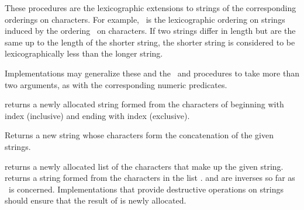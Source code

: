 \begin{entry}{%
}

These procedures are the lexicographic extensions to strings of the
corresponding orderings on characters.  For example, \ is
the lexicographic ordering on strings induced by the ordering
\ on characters.  If two strings differ in length but
are the same up to the length of the shorter string, the shorter string
is considered to be lexicographically less than the longer string.

Implementations may generalize these and the \ and
 procedures to take more than two arguments, as with
the corresponding numeric predicates.

\end{entry}


\begin{entry}{%
}

 returns a newly allocated string formed from the characters of
 beginning with index  (inclusive) and ending with index
 (exclusive).
\end{entry}


\begin{entry}{%
}

Returns a new string whose characters form the concatenation of the
given strings.

\end{entry}


\begin{entry}{%
}

 returns a newly allocated list of the
characters that make up the given string.  
returns a string formed from the characters in the list .
 and  are inverses so
far as \ is concerned.  Implementations that provide
destructive operations on strings should ensure that the result of
 is newly allocated.

\end{entry}


